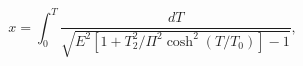 \begin{equation}
x =\int_{0}^{T}\frac{dT}{\sqrt{
E^{2}[1 + T_2^2/\Pi^2 \cosh^{2}(T/T_{0})]-1}},
\end{equation}

